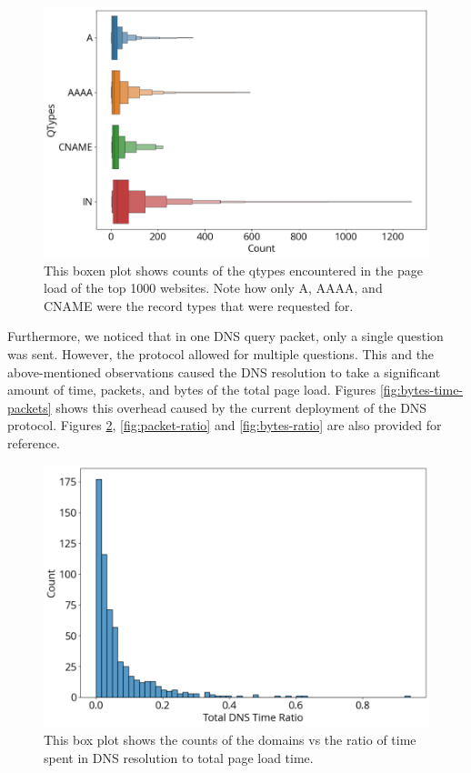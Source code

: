 \documentclass[conference]{IEEEtran}
\begin{document}
\begin{figure}[htbp]
    \centering
    \includegraphics[width=1\linewidth]{images/qtypes.png}
    \caption{This boxen plot shows counts of the qtypes encountered in the page load of the top 1000 websites. Note how only A, AAAA, and CNAME were the record types that were requested for.}
    \label{fig:qtypes}
\end{figure}

Furthermore, we noticed that in one DNS query packet, only a single question was sent. However, the protocol allowed for multiple questions. This and the above-mentioned observations caused the DNS resolution to take a significant amount of time, packets, and bytes of the total page load. Figures \ref{fig:bytes-time-packets} shows this overhead caused by the current deployment of the DNS protocol. Figures \ref{fig:time-ratio}, \ref{fig:packet-ratio} and \ref{fig:bytes-ratio} are also provided for reference.

\begin{figure}[htbp]
    \centering
    \includegraphics[width=1\linewidth]{images/time-ratio.png}
    \caption{This box plot shows the counts of the domains vs the ratio of time spent in DNS resolution to total page load time.}
    \label{fig:time-ratio}
\end{figure}
\end{document}
